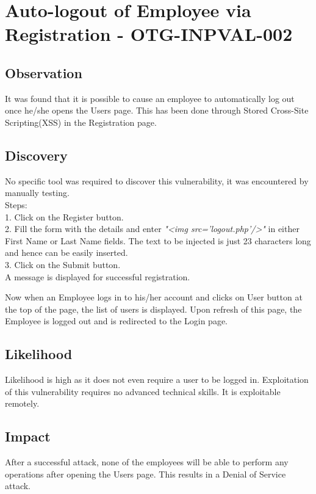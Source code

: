 \section{Auto-logout of Employee via Registration - OTG-INPVAL-002}

\subsection{Observation}
It was found that it is possible to cause an employee to automatically log out once he/she opens the Users page. This has been done through Stored Cross-Site Scripting(XSS) in the Registration page.

\subsection{Discovery}
No specific tool was required to discover this vulnerability, it was encountered by manually testing.\\
Steps: \\
1. Click on the Register button. \\
2. Fill the form with the details and enter \textit{"<img src='logout.php'/>"} in either First Name or Last Name fields. The text to be injected is just 23 characters long and hence can be easily inserted.\\
3. Click on the Submit button. \\
A message is displayed for successful registration.

Now when an Employee logs in to his/her account and clicks on User button at the top of the page, the list of users is displayed. Upon refresh of this page, the Employee is logged out and is redirected to the Login page.

\subsection{Likelihood}
Likelihood is high as it does not even require a user to be logged in.
Exploitation of this vulnerability requires no advanced technical skills. It is exploitable remotely.

\subsection{Impact}
After a successful attack, none of the employees will be able to perform any operations after opening the Users page. This results in a Denial of Service attack.

